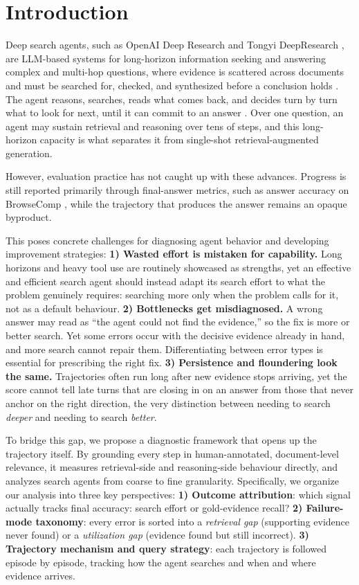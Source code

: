 \section{Introduction}

Deep search agents, such as OpenAI Deep Research and Tongyi DeepResearch \citep{Team2025TongyiDeepResearchTechnical}, are LLM-based systems for long-horizon information seeking and answering complex and multi-hop questions, where evidence is scattered across documents and must be searched for, checked, and synthesized before a conclusion holds \citep{Shi2025DeepResearchA}. The agent reasons, searches, reads what comes back, and decides turn by turn what to look for next, until it can commit to an answer \citep{Team2025MiroThinkerPushingthe}. Over one question, an agent may sustain retrieval and reasoning over tens of steps, and this long-horizon capacity is what separates it from single-shot retrieval-augmented generation.

However, evaluation practice has not caught up with these advances. Progress is still reported primarily through final-answer metrics, such as answer accuracy on BrowseComp \citep{Wei2025BrowseCompASimple}, while the trajectory that produces the answer remains an opaque byproduct. 

This poses concrete challenges for diagnosing agent behavior and developing improvement strategies:
\textbf{1) Wasted effort is mistaken for capability.} Long horizons and heavy tool use are routinely showcased as strengths, yet an effective and efficient search agent should instead adapt its search effort to what the problem genuinely requires: searching more only when the problem calls for it, not as a default behaviour.
\textbf{2) Bottlenecks get misdiagnosed.} A wrong answer may read as ``the agent could not find the evidence,'' so the fix is more or better search. Yet some errors occur with the decisive evidence already in hand, and more search cannot repair them. Differentiating between error types is essential for prescribing the right fix. 
\textbf{3) Persistence and floundering look the same.} Trajectories often run long after new evidence stops arriving, yet the score cannot tell late turns that are closing in on an answer from those that never anchor on the right direction, the very distinction between needing to search \emph{deeper} and needing to search \emph{better}.

To bridge this gap, we propose a diagnostic framework that opens up the trajectory itself. 
By grounding every step in human-annotated, document-level relevance, it measures retrieval-side and reasoning-side behaviour directly, and analyzes search agents from coarse to fine granularity.
Specifically, we organize our analysis into three key perspectives:
\textbf{1) Outcome attribution}: which signal actually tracks final accuracy: search effort or gold-evidence recall?
\textbf{2) Failure-mode taxonomy}: every error is sorted into a \emph{retrieval gap} (supporting evidence never found) or a \emph{utilization gap} (evidence found but still incorrect).
\textbf{3) Trajectory mechanism and query strategy}: each trajectory is followed episode by episode, tracking how the agent searches and when and where evidence arrives.

